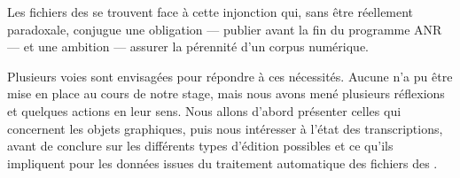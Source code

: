 Les fichiers des \odm{} se trouvent face à cette injonction qui, sans être réellement paradoxale, conjugue une obligation --- publier avant la fin du programme ANR \timeus{} --- et une ambition --- assurer la pérennité d'un corpus numérique.

Plusieurs voies sont envisagées pour répondre à ces nécessités. Aucune n'a pu être mise en place au cours de notre stage, mais nous avons mené plusieurs réflexions et quelques actions en leur sens. Nous allons d'abord présenter celles qui concernent les objets graphiques, puis nous intéresser à l'état des transcriptions, avant de conclure sur les différents types d'édition possibles et ce qu'ils impliquent pour les données issues du traitement automatique des fichiers des \odm.


\newpage
\thispagestyle{empty}
\mbox{}
\newpage